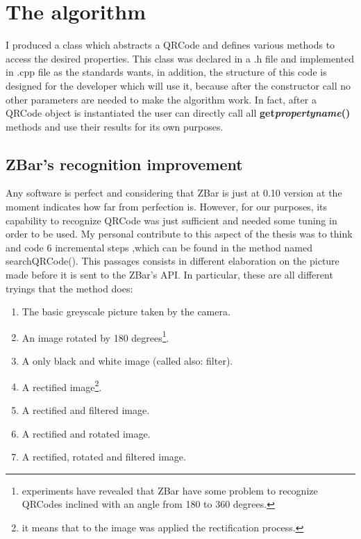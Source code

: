 \chapter{The algorithm}

I produced a class which abstracts a QRCode and defines various methods to access the desired properties. This class was declared in a .h file and implemented in .cpp file as the standards wants, in addition, the structure of this code is designed for the developer which will use it, because after the constructor call no other parameters are needed to make the algorithm work.
In fact, after a QRCode object is instantiated the user can directly call all \textbf{get\textunderscore{}\emph{propertyname}()} methods and use their results for its own purposes.

\section{ZBar's recognition improvement} 
Any software is perfect and considering that ZBar is just at 0.10 version at the moment indicates how far from perfection is.
However, for our purposes, its capability to recognize QRCode was just sufficient and needed some tuning in order to be used.
My personal contribute to this aspect of the thesis was to think and code 6 incremental steps ,which can be found in the method named searchQRCode().
This passages consists in different elaboration on the picture made before it is sent to the ZBar's API.
In particular, these are all different tryings that the method does:

\begin{enumerate}
	\item The basic greyscale picture taken by the camera.
	\item An image rotated by 180 degrees\footnote{ experiments have revealed that ZBar have some problem to recognize QRCodes inclined with an angle from 180 to 360 degrees.}.
	\item A only black and white image (called also: filter).
	\item A rectified image\footnote{ it means that to the image was applied the rectification process.}.
	\item A rectified and filtered image.
	\item A rectified and rotated image.
	\item A rectified, rotated and filtered image.
\end{enumerate}


